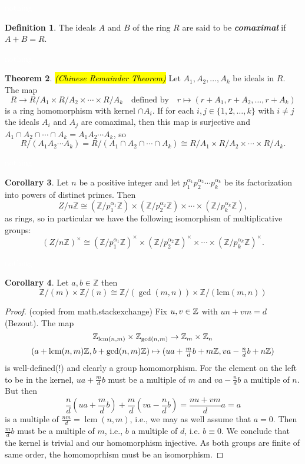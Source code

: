 \documentclass{article}
\theoremstyle{definition}
\newtheorem{thm}{Theorem}[section]
\newtheorem{cor}[thm]{Corollary}
\newtheorem{defn}[thm]{Definition}
\newcommand{\nl}{\textcolor{white}{nothing}}
\newcommand{\ra}{\rightarrow}
\newcommand{\Z}{\mathbb{Z}}
\newcommand{\al}{\alpha}
\begin{document}
\nl

\begin{defn}
The ideals $A$ and $B$ of the ring $R$ are said to be \textbf{\textit{comaximal}} if $A + B = R$.
\end{defn}

\nl

\begin{thm}\hl{\textit{(Chinese Remainder Theorem)}} Let $A_1,A_2,\ldots,A_k$ be ideals in $R$. The map
\[R\ra R/A_1\times R/A_2\times\cdots\times R/A_k\quad\text{defined by}\quad r\mapsto(r+A_1,r+A_2,\ldots,r+A_k)\]
is a ring homomorphism with kernel $\cap A_i$. If for each $i,j\in\{1,2,\ldots,k\}$ with $i\neq j$ the ideals $A_i$ and $A_j$ are comaximal, then this map is surjective and $A_1\cap A_2\cap\cdots\cap A_k = A_1A_2\cdots A_k$, so
\[R/(A_1A_2\cdots A_k) = R/(A_1\cap A_2\cap\cdots\cap A_k) \cong R/A_1\times R/A_2\times\cdots\times R/A_k.\]
\end{thm}

\nl

\begin{cor}
Let $n$ be a positive integer and let $p_1^{\al_1}p_2^{\al_2}\cdots p_k^{\al_k}$ be its factorization into powers of distinct primes. Then
\[Z/n\Z \cong (\Z/p_1^{\al_1}\Z)\times(\Z/p_2^{\al_2}\Z)\times\cdots\times (\Z/p_k^{\al_k}\Z),\]
as rings, so in particular we have the following isomorphism of multiplicative groups:
\[(Z/n\Z)^\times \cong (\Z/p_1^{\al_1}\Z)^\times\times(\Z/p_2^{\al_2}\Z)^\times\times\cdots\times (\Z/p_k^{\al_k}\Z)^\times.\]
\end{cor}

\nl

\begin{cor}
Let $a,b\in \Z$ then
\[\Z/(m)\times \Z/(n) \cong \Z/(\gcd(m,n))\times \Z/(\text{lcm}(m,n))\]
\end{cor}

\begin{proof}(copied from math.stackexchange)
Fix $u,v\in\Bbb Z$ with $un+vm=d$ (Bezout). 
The map $$\Bbb Z_{\operatorname{lcm}(n,m)}\times\Bbb Z_{\gcd(n,m)} \to\Bbb Z_m\times\Bbb Z_n$$
$$ (a+\operatorname{lcm}(n,m)\Bbb Z,b+\gcd(n,m)\Bbb Z)\mapsto(ua+\tfrac mdb+m\Bbb Z,va-\tfrac ndb+n\Bbb Z)$$
is well-defined(!) and clearly a group homomorphism.
For the element on the left to be in the kernel, 
$ua+\tfrac mdb$ must be a multiple of $m$ and $va-\tfrac ndb$ a multiple of $n$.
But then
$$\frac nd\left(ua+\frac mdb\right)+\frac md\left(va-\frac ndb\right) 
=\frac{nu+vm}{d}a=a$$ 
is a multiple of $\frac{nm}d=\operatorname{lcm}(n,m)$, i.e., we may as well assume that $a=0$. Then $\frac mdb$ must be a multiple of $m$, i.e., $b$ a multiple of $d$, i.e. $b\equiv 0$. We conclude that the kernel is trivial and our homomorphism injective. As both groups are finite of same order, the homomoprhism must be an isomorphism.
\end{proof}
\end{document}
